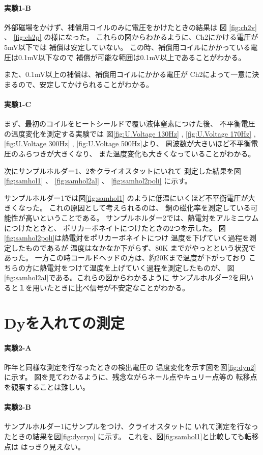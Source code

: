 \paragraph{実験1-B}

外部磁場をかけず、補償用コイルのみに電圧をかけたときの結果は
図 \ref{fig:ch2v} 、 \ref{fig:ch2p} の様になった。
これらの図からわかるように、Ch2にかける電圧が5mV以下では
補償は安定していない。
この時、補償用コイルにかかっている電圧は0.1mV以下なので
補償が可能な範囲は0.1mV以上であることがわかる。

また、0.1mV以上の補償は、補償用コイルにかかる電圧が
Ch2によって一意に決まるので、安定してかけられることがわかる。

\paragraph{実験1-C}

まず、最初のコイルをヒートシールドで覆い液体窒素につけた後、
不平衡電圧の温度変化を測定する実験では
図\ref{fig:U.Voltage 130Hz} , \ref{fig:U.Voltage 170Hz} ,
\ref{fig:U.Voltage 300Hz} , \ref{fig:U.Voltage 500Hz}より、
周波数が大きいほど不平衡電圧のふらつきが大きくなり、
また温度変化も大きくなっていることがわかる。

次にサンプルホルダー1、2をクライオスタットにいれて
測定した結果を図\ref{fig:samhol1} 、 \ref{fig:samhol2al} 、
\ref{fig:samhol2poli} に示す。

サンプルホルダー1では図\ref{fig:samhol1}
のように低温にいくほど不平衡電圧が大きくなった。
これの原因として考えられるのは、
銅の磁化率を測定している可能性が高いということである。
サンプルホルダー2では、熱電対をアルミニウムにつけたときと、
ポリカーボネイトにつけたときの2つを示した。
図\ref{fig:samhol2poli}は熱電対をポリカーボネイトにつけ
温度を下げていく過程を測定したものであるが
温度はなかなか下がらず、80K までがやっとという状況であった。
一方この時コールドヘッドの方は、約20Kまで温度が下がっており
こちらの方に熱電対をつけて温度を上げていく過程を測定したものが、
図\ref{fig:samhol2al}である。これらの図からわかるように
サンプルホルダー2を用いると１を用いたときに比べ信号が不安定なことがわかる。


\section{Dyを入れての測定}\label{sec:Dymeasure結果}

\paragraph{実験2-A}

昨年と同様な測定を行なったときの検出電圧の
温度変化を示す図を図\ref{fig:dyn2}に示す。
図を見てわかるように、残念ながらネール点やキュリー点等の
転移点を観察することは難しい。

\paragraph{実験2-B}

サンプルホルダー1にサンプルをつけ、クライオスタットに
いれて測定を行なったときの結果を図\ref{fig:dycryo}
に示す。
これを、図\ref{fig:samhol1}と比較しても転移点は
はっきり見えない。
